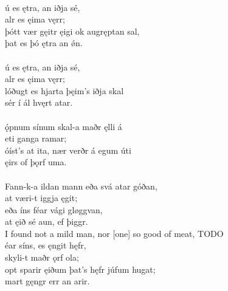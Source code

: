  \\

\bva {}ú es ętra, \hld an iðja sé, \\%
\ind {}alr es ęima vęrr; \\%
þótt vær gęitr ęigi \hld ok augręptan sal, \\%
\ind þat es þó ętra an ǿn.\\%

 \\

\bva {}ú es ętra, \hld an iðja sé, \\%
\ind {}alr es ęima vęrr; \\%
lóðugt es hjarta \hld þęim's iðja skal \\%
\ind sér í ál hvęrt atar.\\%

 \\

\bva {}ǫ́pnum sínum \hld skal-a maðr ęlli á \\%
\ind {}eti ganga ramar; \\%
óíst's at ita, \hld nær verðr á egum úti \\%
\ind {}ęirs of þǫrf uma.\\%

 \\

\bva Fann-k-a ildan mann \hld eða svá atar góðan, \\%
\ind at væri-t iggja ęgit; \\%
eða íns féar \hld {}vági gløggvan, \\%
\ind at ęið sé aun, ef þiggr.\\%

\bvb I found not a mild man, nor [one] so good of meat, TODO \\

\bva {}éar síns, \hld es ęngit hęfr, \\%
\ind skyli-t maðr ǫrf ola; \\%
opt sparir ęiðum \hld þat's hęfr júfum hugat; \\%
\ind mart gęngr err an arir.\\%

